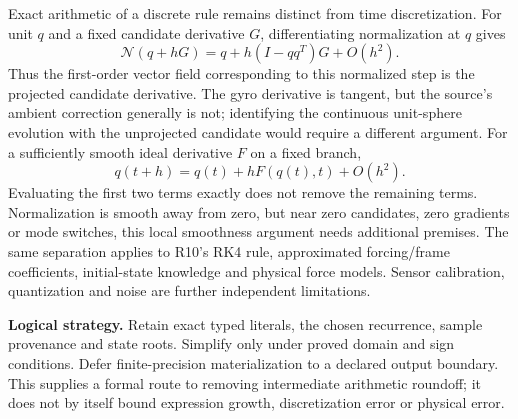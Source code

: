 Exact arithmetic of a discrete rule remains distinct from time discretization.
For unit $q$ and a fixed candidate derivative $G$, differentiating normalization
at $q$ gives
\[
 \mathcal N(q+hG)=q+h(I-qq^T)G+O(h^2).
\]
Thus the first-order vector field corresponding to this normalized step is
the projected candidate derivative. The gyro derivative is tangent, but the
source's ambient correction generally is not; identifying the continuous
unit-sphere evolution with the unprojected candidate would require a different
argument.
For a sufficiently smooth ideal derivative $F$ on a fixed branch,
\[
q(t+h)=q(t)+hF(q(t),t)+O(h^2).
\]
Evaluating the first two terms exactly does not remove the remaining terms.
Normalization is smooth away from zero, but near zero candidates, zero gradients
or mode switches, this local smoothness argument needs additional premises.
The same separation applies to R10's RK4 rule, approximated forcing/frame
coefficients, initial-state knowledge and physical force models. Sensor
calibration, quantization and noise are further independent limitations.

\begin{panel}
\textbf{Logical strategy.} Retain exact typed literals, the chosen recurrence,
sample provenance and state roots. Simplify only under proved domain and sign
conditions. Defer finite-precision materialization to a declared output boundary.
This supplies a formal route to removing intermediate arithmetic roundoff; it
does not by itself bound expression growth, discretization error or physical error.
\end{panel}
